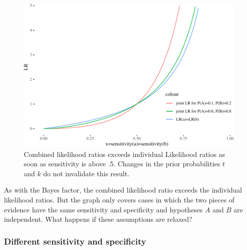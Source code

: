 \documentclass[
  10pt,
  dvipsnames,enabledeprecatedfontcommands]{scrartcl}
\begin{document}
\begin{figure}

\begin{center}\includegraphics[width=0.9\linewidth]{conjunction-paradox4_files/figure-latex/unnamed-chunk-3-1} \end{center}

\caption{Combined likelihood ratios exceeds individual Likelihood ratios as soon as sensitivity is above .5. Changes in the prior probabilities $t$ and $k$ do not invalidate this result.}
\label{fig:jointLRMarcello}
\end{figure}

\noindent As with the Bayes factor, the combined likelihood ratio
exceeds the individual likelihood ratios. But the graph only covers
cases in which the two pieces of evidence have the same sensitivity and
specificity and hypotheses \(A\) and \(B\) are independent. What happens
if these assumptions are relaxed?

\hypertarget{different-sensitivity-and-specificity}{%
\subsubsection{Different sensitivity and
specificity}\label{different-sensitivity-and-specificity}}
\end{document}
